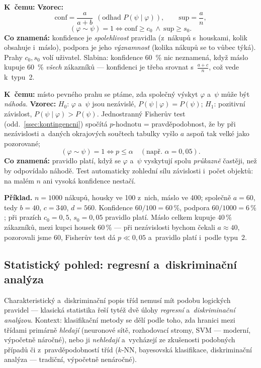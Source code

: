 \documentclass[11pt,a4paper]{article}
\theoremstyle{definition}
\begin{document}
\begin{defbox}
\textbf{K~čemu:}  \textbf{Vzorec:}
\[ \mathrm{conf}=\frac{a}{a+b}\ \ (\text{odhad } P(\psi\mid\varphi)),\qquad
   \mathrm{sup}=\frac{a}{n}, \]
\[ (\varphi\sim\psi)=1 \iff \mathrm{conf}\ge c_0\ \wedge\ \mathrm{sup}\ge s_0 . \]
\textbf{Co znamená:} konfidence je \emph{spolehlivost} pravidla (z~nákupů s~houskami,
kolik obsahuje i~máslo), podpora je jeho \emph{významnost} (kolika nákupů se to vůbec
týká). Prahy $c_0, s_0$ volí uživatel. Slabina: konfidence 60~\% nic neznamená, když máslo
kupuje 60~\% \emph{všech} zákazníků --- konfidenci je třeba srovnat s~$\tfrac{a+c}{n}$,
což vede k~typu~2.
\end{defbox}

\begin{defbox}
\textbf{K~čemu:} místo pevného prahu se ptáme, zda společný výskyt $\varphi$ a~$\psi$
může být \emph{náhoda}. \textbf{Vzorec:} $H_0$: $\varphi$ a~$\psi$ jsou nezávislé,
$P(\psi\mid\varphi)=P(\psi)$; $H_1$: pozitivní závislost, $P(\psi\mid\varphi)>P(\psi)$.
Jednostranný Fisherův test (odd.~\ref{ssec:kontingencni}) spočítá $p$-hodnotu =
pravděpodobnost, že by při nezávislosti a~daných okrajových součtech tabulky vyšlo $a$
aspoň tak velké jako pozorované;
\[ (\varphi\sim\psi)=1 \iff p\le\alpha \quad(\text{např.\ } \alpha=0{,}05). \]
\textbf{Co znamená:} pravidlo platí, když se $\varphi$ a~$\psi$ vyskytují spolu
\emph{průkazně} častěji, než by odpovídalo náhodě. Test automaticky zohlední sílu
závislosti i~počet objektů: na malém $n$ ani vysoká konfidence nestačí.
\end{defbox}

\textbf{Příklad.} $n=1000$ nákupů, housky ve 100 z~nich, máslo ve 400; společně $a=60$,
tedy $b=40$, $c=340$, $d=560$. Konfidence $60/100=60\,\%$, podpora $60/1000=6\,\%$; při
prazích $c_0=0{,}5$, $s_0=0{,}05$ pravidlo platí. Máslo celkem kupuje $40\,\%$
zákazníků, mezi kupci housek $60\,\%$ --- při nezávislosti bychom čekali $a\approx40$,
pozorovali jsme 60, Fisherův test dá $p\ll0{,}05$ a~pravidlo platí i~podle typu~2.

\subsection{Statistický pohled: regresní a~diskriminační analýza}
\label{ssec:stat-pohled}

Charakteristický a~diskriminační popis tříd nemusí mít podobu logických pravidel ---
klasická statistika řeší tytéž dvě úlohy \emph{regresní} a~\emph{diskriminační analýzou}.
Kontext: klasifikační metody se dělí podle toho, zda hranici mezi třídami primárně
\emph{hledají} (neuronové sítě, rozhodovací stromy, SVM --- moderní, výpočetně náročné),
nebo ji \emph{nehledají} a~vycházejí ze zkušenosti podobných případů či
z~pravděpodobností tříd ($k$-NN, bayesovská klasifikace, diskriminační analýza ---
tradiční, výpočetně nenáročné).
\end{document}

